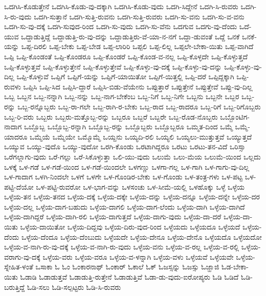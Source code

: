 {ಒದಗಿಸಿ-ಕೊಡುತ್ತೇನೆ
ಒದಗಿಸಿ-ಕೊಡು-ವು-ದಕ್ಕಾಗಿ
ಒದಗಿಸಿ-ಕೊಡು-ವುದು
ಒದಗಿ-ಸಿದ್ದೇನೆ
ಒದಗಿ-ಸಿ-ರುವರು
ಒದಗಿ-ಸಿ-ರು-ವುದು
ಒದಗಿ-ಸುತ್ತಾನೆ
ಒದಗಿ-ಸುತ್ತಿ-ರುವನು
ಒದಗಿ-ಸುತ್ತಿ-ರುವರು
ಒದಗಿ-ಸು-ವನು
ಒದಗಿ-ಸು-ವ-ವನು
ಒದಗಿ-ಸು-ವು-ದಕ್ಕೆ
ಒದಗಿ-ಸುವುದ-ರಿಂದ
ಒದಗಿ-ಸು-ವುದು
ಒದಗಿ-ಸು-ವೆನು
ಒದಗುವ
ಒದಗು-ವು-ದೆಂದು
ಒದೆ-ಯುವ
ಒದ್ದಾಡುತ್ತಿದ್ದೆ
ಒದ್ದಾಡುತ್ತಿ-ರು-ವು-ದನ್ನು
ಒದ್ದಾಡುತ್ತಿರು-ವೆ-ಯಾ-ನ-ನಗೆ
ಒದ್ದಾ-ಡುವಂತೆ
ಒದ್ದೆ
ಒನಕೆ
ಒನಕೆ-ಯನ್ನು
ಒಪ್ಪ-ದಿರಲಿ
ಒಪ್ಪ-ಬೇಕು
ಒಪ್ಪ-ಬೇಡ
ಒಪ್ಪ-ಲಾರಿರಿ
ಒಪ್ಪಲಿ
ಒಪ್ಪ-ಲಿಲ್ಲ
ಒಪ್ಪಲೇ-ಬೇಕಾ-ಯಿತು
ಒಪ್ಪ-ವಾಗಿದೆ
ಒಪ್ಪಿ
ಒಪ್ಪಿ-ಕೊಂಡಂತೆ
ಒಪ್ಪಿ-ಕೊಂಡರೂ
ಒಪ್ಪಿ-ಕೊಂಡರೆ
ಒಪ್ಪಿ-ಕೊಂಡ-ವ-ನಲ್ಲ
ಒಪ್ಪಿ-ಕೊಳ್ಳದೇ
ಒಪ್ಪಿ-ಕೊಳ್ಳುತ್ತದೆ
ಒಪ್ಪಿ-ಕೊಳ್ಳುತ್ತವೆ
ಒಪ್ಪಿ-ಕೊಳ್ಳುತ್ತೇನೆ
ಒಪ್ಪಿ-ಕೊಳ್ಳುತ್ತೇವೆ
ಒಪ್ಪಿ-ಕೊಳ್ಳು-ವು-ದಕ್ಕೆ
ಒಪ್ಪಿ-ಕೊಳ್ಳು-ವು-ದನ್ನು
ಒಪ್ಪಿ-ಕೊಳ್ಳು-ವು-ದಿಲ್ಲ
ಒಪ್ಪಿ-ಕೊಳ್ಳುವೆ
ಒಪ್ಪಿಗೆ
ಒಪ್ಪಿಗೆ-ಯನ್ನು
ಒಪ್ಪಿಗೆ-ಯಾಯಿತೋ
ಒಪ್ಪಿಗೆ-ಯಿತ್ತಲ್ಲಿ
ಒಪ್ಪಿ-ದರೆ
ಒಪ್ಪಿದ್ದಕ್ಕಾಗಿ
ಒಪ್ಪಿ-ರುವಳು
ಒಪ್ಪಿಸಿ
ಒಪ್ಪಿ-ಸಿದ
ಒಪ್ಪಿಸಿ-ದ್ದಾರೆ
ಒಪ್ಪಿಸಿ-ಬಿಡು-ವೆಯೇನು
ಒಪ್ಪುತ್ತಾರೆ
ಒಪ್ಪುತ್ತೇನೆ
ಒಪ್ಪುತ್ತೇವೆ
ಒಪ್ಪು-ವು-ದಿಲ್ಲ
ಒಬ್ಬ
ಒಬ್ಬನ
ಒಬ್ಬ-ನನ್ನಾಗಿ
ಒಬ್ಬ-ನನ್ನು
ಒಬ್ಬ-ನಾಗ-ಬೇಕೆಂಬ
ಒಬ್ಬ-ನಿಗೆ
ಒಬ್ಬ-ನಿಗೇ
ಒಬ್ಬನು
ಒಬ್ಬನೇ
ಒಬ್ಬರ
ಒಬ್ಬ-ರನ್ನು
ಒಬ್ಬ-ರನ್ನೊಬ್ಬರು
ಒಬ್ಬ-ರಾ-ಗಲೇ
ಒಬ್ಬ-ರಾಗಿ-ರ-ಬೇಕು
ಒಬ್ಬ-ರಾದ
ಒಬ್ಬ-ರಾದರೂ
ಒಬ್ಬ-ರಿಗೆ
ಒಬ್ಬ-ರಿಗೊಬ್ಬರು
ಒಬ್ಬ-ರಿ-ವರು
ಒಬ್ಬರು
ಒಬ್ಬರು-ಮತ್ತೊಬ್ಬ-ರನ್ನು
ಒಬ್ಬರೂ
ಒಬ್ಬರೆ
ಒಬ್ಬರೇ
ಒಬ್ಬ-ರೊಡ-ನೊಬ್ಬರು
ಒಬ್ಬೊಂಟಿಗ-ನಾದಾಗ
ಒಬ್ಬೊಬ್ಬ
ಒಬ್ಬೊಬ್ಬ-ರನ್ನಾಗಿ
ಒಬ್ಬೊಬ್ಬ-ರನ್ನು
ಒಬ್ಬೊಬ್ಬರು
ಒಬ್ಬೊಬ್ಬರೂ
ಒಮ್ಮತ-ದಿಂದ
ಒಮ್ಮೆ
ಒಮ್ಮೆ-ಯಾದರೂ
ಒಮ್ಮೆಯೆ
ಒಮ್ಮೆಯೇ
ಒಮ್ಮೊಮ್ಮೆ
ಒಯ್ದನು
ಒಯ್ಯದಿ-ರಲಿ
ಒಯ್ಯಲಿ
ಒಯ್ಯಲು-ಮುತ್ತುತ್ತವೆ
ಒಯ್ಯುತ್ತದೆ
ಒಯ್ಯುವ
ಒಯ್ಯು-ವುದೊ
ಒಯ್ಯು-ವುದೋ
ಒರಗಿ-ಕೊಂಡು
ಒರಟಾಗಿದ್ದರೂ
ಒರಟು
ಒರಟು-ತನ-ವಿದೆ
ಒರಿಸ್ಸಾ
ಒರೆಗಲ್ಲಾಗು-ವುದು
ಒರೆ-ಗಲ್ಲು
ಒರೆ-ಸಿಕೊಳ್ಳುತ್ತಾ
ಒಲಿ-ಯು-ವುದು
ಒಲುಮೆ
ಒಲು-ಮೆಯ
ಒಲುಮೆ-ಯಿಂದ
ಒಲ್ಲದು
ಒಳಕ್ಕೆ
ಒಳ-ಗಡೆ
ಒಳ-ಗಡೆ-ಯಿಂದ
ಒಳ-ಗಡೆ-ಯಿಂದಲೇ
ಒಳಗಣ್ಣು
ಒಳಗಾ-ಗಲ್ಲ
ಒಳ-ಗಾಗಿ
ಒಳ-ಗಾಗು-ವು-ದಿಲ್ಲ
ಒಳ-ಗಾದಾಗ
ಒಳಗಿ-ನಿಂದಲೇ
ಒಳಗೆ
ಒಳಗೇ
ಒಳ-ಗೊಂಡಿರ-ಬೇಕು
ಒಳ-ಗೊಂಡು
ಒಳ-ತಂತ್ರ-ಗಳು
ಒಳ-ಪಟ್ಟ
ಒಳ-ಪಟ್ಟಿ-ದೆಯೋ
ಒಳ-ಪಟ್ಟಿ-ರುವರೋ
ಒಳ-ಭಾಗ-ವನ್ನು
ಒಳಸಂಚು
ಒಳ-ಸೀಮೆ-ಯಲ್ಲಿ
ಒಳಹೊಕ್ಕು
ಒಳ್ಳೆ
ಒಳ್ಳೆಯ
ಒಳ್ಳೆಯ-ತನ
ಒಳ್ಳೆಯ-ತನದ
ಒಳ್ಳೆಯ-ದಕ್ಕೆ
ಒಳ್ಳೆಯ-ದಕ್ಕೇ
ಒಳ್ಳೆಯ-ದನ್ನು
ಒಳ್ಳೆಯ-ದನ್ನೂ
ಒಳ್ಳೆಯ-ದನ್ನೇ
ಒಳ್ಳೆಯ-ದರ
ಒಳ್ಳೆಯ-ದಲ್ಲ
ಒಳ್ಳೆಯ-ದಾಗ-ಬಹುದು
ಒಳ್ಳೆಯ-ದಾಗಲಿ
ಒಳ್ಳೆಯ-ದಾಗ-ಲೆಂದು
ಒಳ್ಳೆಯ-ದಾಗಿ
ಒಳ್ಳೆಯ-ದಾಗಿದೆ
ಒಳ್ಳೆಯ-ದಾಗಿದ್ದರೆ
ಒಳ್ಳೆಯ-ದಾಗಿ-ರಲಿ
ಒಳ್ಳೆಯ-ದಾಗುತ್ತದೆ
ಒಳ್ಳೆಯ-ದಾಗು-ವುದು
ಒಳ್ಳೆಯ-ದಾ-ದರೆ
ಒಳ್ಳೆಯ-ದಾ-ಯಿತು
ಒಳ್ಳೆಯ-ದಾಯಿತೋ
ಒಳ್ಳೆಯ-ದಿದ್ದವು
ಒಳ್ಳೆಯ-ದಿರು-ವುದ-ರಿಂದ
ಒಳ್ಳೆಯದು
ಒಳ್ಳೆಯದೂ
ಒಳ್ಳೆಯದೆ
ಒಳ್ಳೆಯ-ದೆಂದು
ಒಳ್ಳೆಯ-ದೆಂದೂ
ಒಳ್ಳೆಯ-ದೆಂಬುದು
ಒಳ್ಳೆಯದೇ
ಒಳ್ಳೆಯ-ದೇನೂ
ಒಳ್ಳೆಯ-ದೇನೊ
ಒಳ್ಳೆಯದೊ
ಒಳ್ಳೆಯದೋ
ಒಳ್ಳೆಯ-ವ-ನಾಗಿ-ರು-ವು-ದಕ್ಕೆ
ಒಳ್ಳೆಯ-ವ-ನಾಗಿ-ರು-ವುದು
ಒಳ್ಳೆಯ-ವನು
ಒಳ್ಳೆಯ-ವ-ರಲ್ಲ
ಒಳ್ಳೆಯ-ವ-ರಲ್ಲಿ
ಒಳ್ಳೆಯ-ವರಾಗು-ವು-ದಕ್ಕೆ
ಒಳ್ಳೆಯ-ವರು
ಒಳ್ಳೆಯ-ವರೂ
ಒಳ್ಳೆಯ-ವ-ಳನ್ನಾಗಿ
ಒಳ್ಳೆಯ-ವಳು
ಒಳ್ಳೆಯವೆ
ಒಳ್ಳೆಯವೇ
ಒಳ್ಳೆಯ-ಸ್ನೇಹಿತ-ಳಂತೆ
ಒಸಾಕಾ
ಓ
ಓಂ
ಓಂಕಾರನಾಥ್
ಓಂಕಾರ್
ಓಕಾಲೆ
ಓಕ್
ಓಜಸ್ಸನ್ನು
ಓಜಸ್ಸು
ಓಜ್ಹಾಜಿ
ಓಡ-ಬೇಕಾ-ಯಿತು
ಓಡಾಡಿ
ಓಡಾಡುತ್ತವೆ
ಓಡಾಡುತ್ತಿ-ರುತ್ತೇನೆ
ಓಡಾಡುತ್ತಿವೆ
ಓಡಾ-ಡು-ವುದು-ಐರೋಪ್ಯರು
ಓಡಿ
ಓಡಿದೆ
ಓಡಿ-ಬರುತ್ತಿದ್ದೆ
ಓಡಿ-ಸಲು
ಓಡಿ-ಸಲ್ಪಟ್ಟರು
ಓಡಿ-ಸಿ-ರುವರು
}
